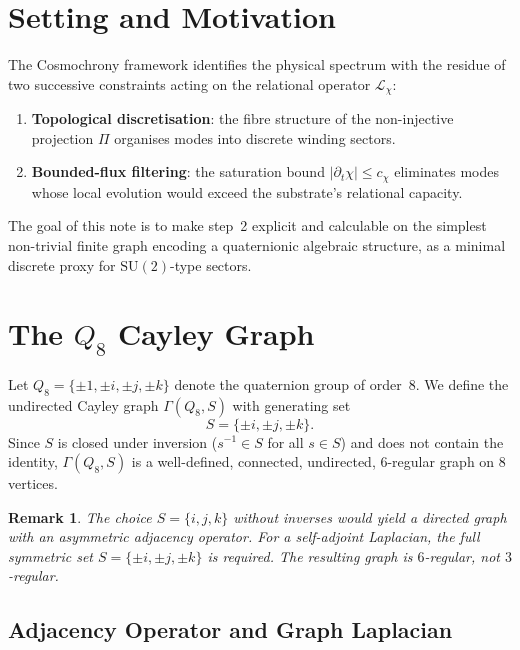 \documentclass[11pt,a4paper]{article}
\newtheorem{remark}{Remark}
\begin{document}
  \section{Setting and Motivation}

    The Cosmochrony framework identifies the physical spectrum with the residue of two
    successive constraints acting on the relational operator $\mathcal{L}_\chi$:
    \begin{enumerate}
      \item \textbf{Topological discretisation}: the fibre structure of the non-injective
      projection $\Pi$ organises modes into discrete winding sectors.
      \item \textbf{Bounded-flux filtering}: the saturation bound
      $|\partial_t \chi| \leq c_\chi$ eliminates modes whose local evolution would
      exceed the substrate's relational capacity.
    \end{enumerate}
    The goal of this note is to make step~2 explicit and calculable on the simplest
    non-trivial finite graph encoding a quaternionic algebraic structure,
    as a minimal discrete proxy for $\mathrm{SU}(2)$-type sectors.

  \section{The $Q_8$ Cayley Graph}

    Let $Q_8 = \{{\pm 1, \pm i, \pm j, \pm k}\}$ denote the quaternion group of order~8.
    We define the undirected Cayley graph $\Gamma(Q_8, S)$ with generating set
    \begin{equation}
      S = \{\pm i, \pm j, \pm k\}.
    \end{equation}
    Since $S$ is closed under inversion ($s^{-1} \in S$ for all $s \in S$) and does
    not contain the identity, $\Gamma(Q_8, S)$ is a well-defined, connected, undirected,
    $6$-regular graph on $8$ vertices.

    \begin{remark}
      The choice $S = \{i, j, k\}$ without inverses would yield a directed graph with an
      asymmetric adjacency operator.
      For a self-adjoint Laplacian, the full symmetric set
      $S = \{\pm i, \pm j, \pm k\}$ is required.
      The resulting graph is $6$-regular, not $3$-regular.
    \end{remark}

    \subsection{Adjacency Operator and Graph Laplacian}
\end{document}
